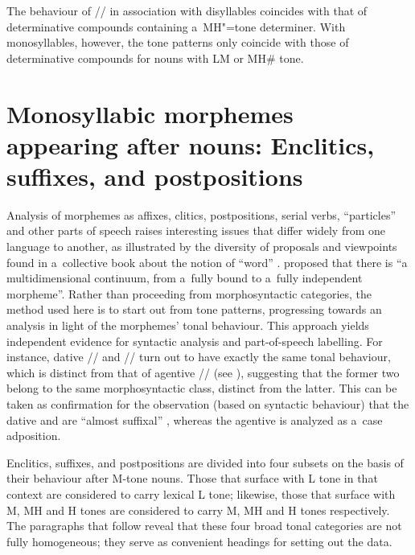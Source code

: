 The behaviour of // in association with disyllables coincides with that of determinative
compounds containing a~MH"=tone determiner. With monosyllables, however, the tone patterns only
coincide with those of determinative compounds for nouns with LM or MH\# tone.




\section[Monosyllabic enclitics, suffixes, and postpositions]{Monosyllabic morphemes appearing after nouns: Enclitics, suffixes, and postpositions}
\label{sec:enclitics}

Analysis of morphemes as affixes, clitics, postpositions, serial verbs, “particles” and other parts of speech raises interesting issues that differ widely from one language to another, as illustrated by the diversity of proposals and viewpoints found in a~collective book about the notion of “word” \citep{dixonetal2002b}. \citet[43]{aikhenvald2002} proposed that there is “a multidimensional continuum, from a~fully bound to a~fully independent morpheme”. Rather than proceeding from morphosyntactic categories, the method used here is to start out from tone patterns, progressing towards an analysis in light of the morphemes' tonal behaviour. This approach yields independent evidence for syntactic analysis and part-of-speech labelling. For instance, dative
// and  // turn out to have exactly the same tonal behaviour, which is distinct from that of agentive // (see ), suggesting that the former two belong to the same morphosyntactic class, distinct from the latter. This can be taken as confirmation for the observation (based on syntactic behaviour) that the dative and  are “almost suffixal” \citep[155]{lidz2010}, whereas the agentive is analyzed as a~case adposition.

Enclitics, suffixes, and postpositions are divided into four subsets on the basis of their behaviour after M-tone nouns. 
Those that surface with L tone in that context are considered to carry lexical L tone; likewise, those that surface with M, MH and H tones are considered to carry M, MH and H tones respectively. The paragraphs that follow reveal that these four broad tonal categories are not fully homogeneous; they serve as convenient headings for setting out the data.

